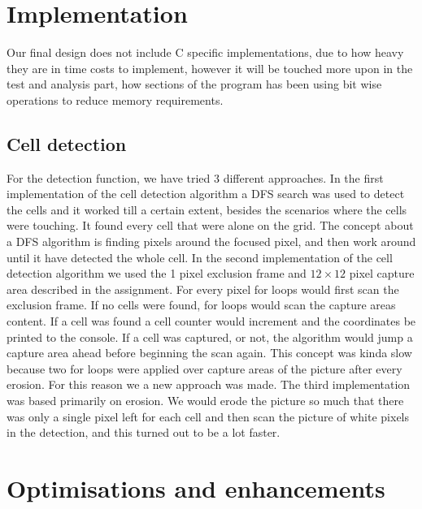 \documentclass[a4paper, english]{article}
\numberwithin{equation}{section}
\begin{document}
\section{Implementation}\label{sec:implementation}
Our final design does not include C specific implementations, due to how heavy they are in time costs to implement, however it will be touched more upon in the test and analysis part, how sections of the program has been using bit wise operations to reduce memory requirements.
\subsection{Cell detection}
For the detection function, we have tried 3 different approaches.\newline
In the first implementation of the cell detection algorithm a DFS search was used to detect the cells and it worked till a certain extent, besides the scenarios where the cells were touching. It found every cell that were alone on the grid. The concept about a DFS algorithm is finding pixels around the focused pixel, and then work around until it have detected the whole cell. \newline
In the second implementation of the cell detection algorithm we used the 1 pixel exclusion frame and \(12\times12\) pixel capture area described in the assignment. For every pixel for loops would first scan the exclusion frame. If no cells were found, for loops would scan the capture areas content. If a cell was found a cell counter would increment and the coordinates be printed to the console. If a cell was captured, or not, the algorithm would jump a capture area ahead before beginning the scan again. This concept was kinda slow because two for loops were applied over capture areas of the picture after every erosion. For this reason we a new approach was made.\newline
The third implementation was based primarily on erosion. We would erode the picture so much that there was only a single pixel left for each cell and then scan the picture of white pixels in the detection, and this turned out to be a lot faster.
\section{Optimisations and enhancements}
\end{document}
